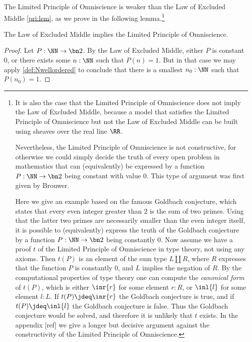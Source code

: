 The Limited Principle of Omniscience is weaker than the Law of Excluded Middle \cref{pri:lem}, as we prove in the following lemma.\footnote{%
  It is also the case that the Limited Principle of Omniscience does not imply the Law of Excluded Middle, because
  a model that satisfies the Limited Principle of Omniscience but not the Law of Excluded Middle can be built using sheaves over the real line $\RR$.

  Nevertheless, the Limited Principle of Omniscience is not constructive,
  for otherwise we could simply decide the truth of every open problem in mathematics 
  that can (equivalently) be expressed by a function $P:\NN\to\bn 2$ being constant with value $0$.
  This type of argument was first given by Brouwer. %

  Here we give an example based on the famous Goldbach conjecture,
  which states that every even integer greater than $2$ is the sum of two primes. Using that
  the latter two primes are necessarily smaller than the even integer itself, it is possible
  to (equivalently) express the truth of the Goldbach conjecture by a function $P:\NN\to\bn 2$
  being constantly $0$. Now assume we have a proof $t$ of the Limited Principle of Omniscience
  in type theory, not using any axioms. Then $t(P)$ is an element of the 
  sum type $L\amalg R$, where $R$ expresses that the function $P$ is constantly $0$, 
  and $L$ implies the negation of $R$.
  By the computational properties of type theory one can compute the 
  \emph{canonical form} of $t(P)$, which is either $\inr{r}$ for some element $r:R$,
  or $\inl{l}$ for some element $l:L$. If $t(P)\jdeq\inr{r}$ the Goldbach conjecture is true, 
  and if $t(P)\jdeq\inl{l}$ the Goldbach conjecture is false. Thus the Goldbach conjecture
  would be solved, and therefore it is unlikely that $t$ exists.
  In the appendix [ref] we give a longer but decisive argument against the constructivity of
  the Limited Principle of Omniscience.  
}


\begin{lemma}
  The Law of Excluded Middle implies the Limited Principle of Omniscience.
\end{lemma}

\begin{proof}
  Let $P:\NN\to\bn 2$. By the Law of Excluded Middle, either $P$ is constant $0$,
  or there exists some $n:\NN$ such that $P(n)=1$.
  But in that case we may apply \cref{def:Nwellordered}
  to conclude that there is a smallest $n_0:\NN$ such that $P(n_0)=1$.
\end{proof}


